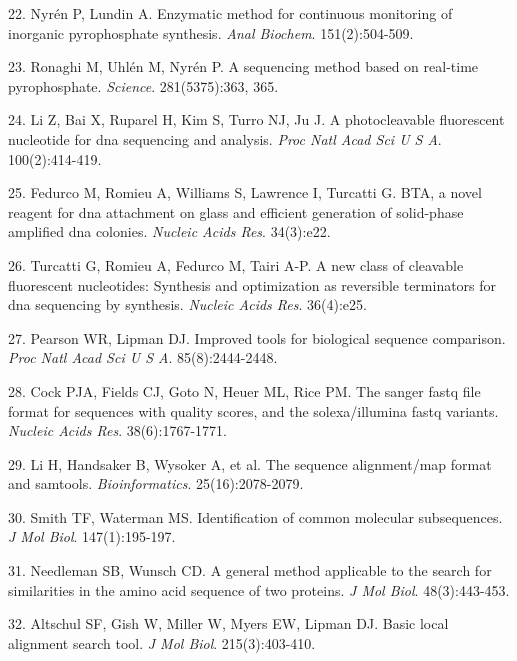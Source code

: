 \documentclass[11pt,letterpaper]{book}
\begin{document}
\leavevmode\hypertarget{ref-nyren:1985aa}{}%
22. Nyrén P, Lundin A. Enzymatic method for continuous monitoring of inorganic pyrophosphate synthesis. \emph{Anal Biochem}. 151(2):504-509.

\leavevmode\hypertarget{ref-ronaghi:1998aa}{}%
23. Ronaghi M, Uhlén M, Nyrén P. A sequencing method based on real-time pyrophosphate. \emph{Science}. 281(5375):363, 365.

\leavevmode\hypertarget{ref-li:2003aa}{}%
24. Li Z, Bai X, Ruparel H, Kim S, Turro NJ, Ju J. A photocleavable fluorescent nucleotide for dna sequencing and analysis. \emph{Proc Natl Acad Sci U S A}. 100(2):414-419.

\leavevmode\hypertarget{ref-fedurco:2006aa}{}%
25. Fedurco M, Romieu A, Williams S, Lawrence I, Turcatti G. BTA, a novel reagent for dna attachment on glass and efficient generation of solid-phase amplified dna colonies. \emph{Nucleic Acids Res}. 34(3):e22.

\leavevmode\hypertarget{ref-turcatti:2008aa}{}%
26. Turcatti G, Romieu A, Fedurco M, Tairi A-P. A new class of cleavable fluorescent nucleotides: Synthesis and optimization as reversible terminators for dna sequencing by synthesis. \emph{Nucleic Acids Res}. 36(4):e25.

\leavevmode\hypertarget{ref-pearson:1988aa}{}%
27. Pearson WR, Lipman DJ. Improved tools for biological sequence comparison. \emph{Proc Natl Acad Sci U S A}. 85(8):2444-2448.

\leavevmode\hypertarget{ref-cock:2010aa}{}%
28. Cock PJA, Fields CJ, Goto N, Heuer ML, Rice PM. The sanger fastq file format for sequences with quality scores, and the solexa/illumina fastq variants. \emph{Nucleic Acids Res}. 38(6):1767-1771.

\leavevmode\hypertarget{ref-li:2009aa}{}%
29. Li H, Handsaker B, Wysoker A, et al. The sequence alignment/map format and samtools. \emph{Bioinformatics}. 25(16):2078-2079.

\leavevmode\hypertarget{ref-smith:1981aa}{}%
30. Smith TF, Waterman MS. Identification of common molecular subsequences. \emph{J Mol Biol}. 147(1):195-197.

\leavevmode\hypertarget{ref-needleman:1970aa}{}%
31. Needleman SB, Wunsch CD. A general method applicable to the search for similarities in the amino acid sequence of two proteins. \emph{J Mol Biol}. 48(3):443-453.

\leavevmode\hypertarget{ref-altschul:1990aa}{}%
32. Altschul SF, Gish W, Miller W, Myers EW, Lipman DJ. Basic local alignment search tool. \emph{J Mol Biol}. 215(3):403-410.
\end{document}
